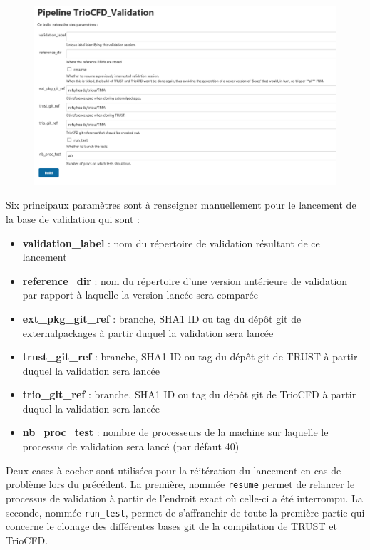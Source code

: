 \begin{figure}[H]
   \centering
   \includegraphics[width=16cm]{pictures/lancement_jenkins.png}
   \vspace*{0.2cm}
\end{figure}
Six principaux paramètres sont à renseigner manuellement pour le lancement de la base de validation qui sont :
\begin{itemize}[label=$\Rightarrow$, font=\LARGE]
   \item \textbf{validation\_label} : nom du répertoire de validation résultant de ce lancement
   \item \textbf{reference\_dir} : nom du répertoire d'une version antérieure de validation par rapport à laquelle la version lancée sera comparée
   \item \textbf{ext\_pkg\_git\_ref} : branche, SHA1 ID ou tag du dépôt git de externalpackages à partir duquel la validation sera lancée
   \item \textbf{trust\_git\_ref} : branche, SHA1 ID ou tag du dépôt git de TRUST à partir duquel la validation sera lancée
   \item \textbf{trio\_git\_ref} : branche, SHA1 ID ou tag du dépôt git de TrioCFD à partir duquel la validation sera lancée
   \item \textbf{nb\_proc\_test} : nombre de processeurs de la machine sur laquelle le processus de validation sera lancé (par défaut 40)
\end{itemize}
Deux cases à cocher sont utilisées pour la réitération du lancement en cas de problème lors du précédent. La première, nommée \texttt{resume} permet de relancer le processus de validation à partir de l'endroit exact où celle-ci a été interrompu. La seconde, nommée \texttt{run\_test}, permet de s'affranchir de toute la première partie qui concerne le clonage des différentes bases git de la compilation de TRUST et TrioCFD.

